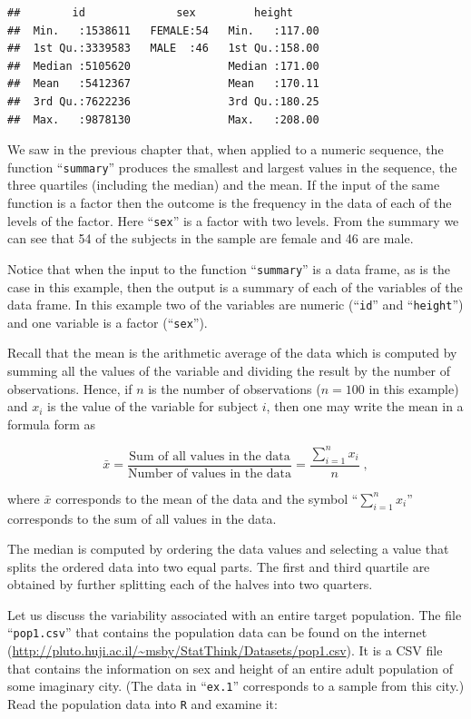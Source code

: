\documentclass[]{krantz}
\theoremstyle{definition}
\theoremstyle{definition}
\theoremstyle{definition}
\theoremstyle{remark}
\begin{document}
\begin{verbatim}
##        id              sex         height      
##  Min.   :1538611   FEMALE:54   Min.   :117.00  
##  1st Qu.:3339583   MALE  :46   1st Qu.:158.00  
##  Median :5105620               Median :171.00  
##  Mean   :5412367               Mean   :170.11  
##  3rd Qu.:7622236               3rd Qu.:180.25  
##  Max.   :9878130               Max.   :208.00
\end{verbatim}

We saw in the previous chapter that, when applied to a numeric sequence,
the function ``\texttt{summary}'' produces the smallest and largest values in the
sequence, the three quartiles (including the median) and the mean. If
the input of the same function is a factor then the outcome is the
frequency in the data of each of the levels of the factor. Here ``\texttt{sex}''
is a factor with two levels. From the summary we can see that 54 of the
subjects in the sample are female and 46 are male.

Notice that when the input to the function ``\texttt{summary}'' is a data frame,
as is the case in this example, then the output is a summary of each of
the variables of the data frame. In this example two of the variables
are numeric (``\texttt{id}'' and ``\texttt{height}'') and one variable is a factor
(``\texttt{sex}'').

Recall that the mean is the arithmetic average of the data which is
computed by summing all the values of the variable and dividing the
result by the number of observations. Hence, if \(n\) is the number of
observations (\(n=100\) in this example) and \(x_i\) is the value of the
variable for subject \(i\), then one may write the mean in a formula form
as

\[\bar x = \frac{\mbox{Sum of all values in the data}}{\mbox{Number of values in the data}} = \frac{\sum_{i=1}^n x_i}{n}\;,\]

where \(\bar x\) corresponds to the mean of the data and the symbol
``\(\sum_{i=1}^n x_i\)'' corresponds to the sum of all values in the data.

The median is computed by ordering the data values and selecting a value
that splits the ordered data into two equal parts. The first and third
quartile are obtained by further splitting each of the halves into two
quarters.

Let us discuss the variability associated with an entire target
population. The file ``\texttt{pop1.csv}'' that contains the population data can
be found on the internet
(\url{http://pluto.huji.ac.il/~msby/StatThink/Datasets/pop1.csv}). It is a
CSV file that contains the information on sex and height of an entire
adult population of some imaginary city. (The data in ``\texttt{ex.1}''
corresponds to a sample from this city.) Read the population data into
\texttt{R} and examine it:
\end{document}
